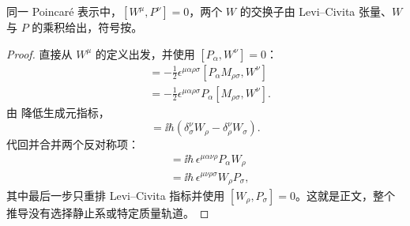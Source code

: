 \begin{proposition}
同一 Poincaré 表示中，$[W^\mu,P^\nu]=0$，两个 $W$ 的交换子由 Levi--Civita 张量、$W$ 与 $P$ 的乘积给出，符号按。
\end{proposition}
\begin{proof}
直接从 $W^\mu$ 的定义出发，并使用 $[P_\alpha,W^\nu]=0$：
\begin{align*}
[W^\mu,W^\nu]
&=-\frac12\epsilon^{\mu\alpha\rho\sigma}
[P_\alpha M_{\rho\sigma},W^\nu]\\
&=-\frac12\epsilon^{\mu\alpha\rho\sigma}
P_\alpha[M_{\rho\sigma},W^\nu].
\end{align*}
由 降低生成元指标，
\begin{equation*}
[M_{\rho\sigma},W^\nu]
=\ii\hbar(\delta_\sigma^\nu W_\rho-\delta_\rho^\nu W_\sigma).
\end{equation*}
代回并合并两个反对称项：
\begin{align*}
[W^\mu,W^\nu]
&=\ii\hbar\,\epsilon^{\mu\alpha\nu\rho}P_\alpha W_\rho\\
&=\ii\hbar\,\epsilon^{\mu\nu\rho\sigma}W_\rho P_\sigma,
\end{align*}
其中最后一步只重排 Levi--Civita 指标并使用 $[W_\rho,P_\sigma]=0$。这就是正文，整个推导没有选择静止系或特定质量轨道。
\end{proof}

